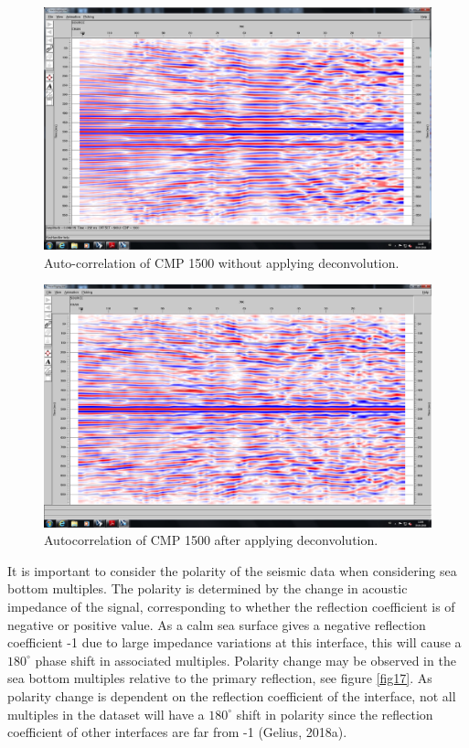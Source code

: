\documentclass[10pt,a4paper]{article}
\begin{document}
\begin{figure}[H]
\includegraphics[width=\textwidth, trim={1.5cm 1.5cm 1cm 1.5cm},clip]{fig15.jpg}
\caption{Auto-correlation of CMP 1500 without applying deconvolution.}
\label{fig15}
\end{figure}

\begin{figure}[H]
\includegraphics[width=\textwidth, trim={1.5cm 1.5cm 1cm 1.5cm},clip]{fig16.jpg}
\caption{Autocorrelation of CMP 1500 after applying deconvolution.}
\label{fig16}
\end{figure}

\noindent It is important to consider the polarity of the seismic data when considering sea bottom multiples. The polarity is determined by the change in acoustic impedance of the signal, corresponding to whether the reflection coefficient is of negative or positive value. As a calm sea surface gives a negative reflection coefficient -1 due to large impedance variations at this interface, this will cause a $180^{\circ}$ phase shift in associated multiples. Polarity change may be observed in the sea bottom multiples relative to the primary reflection, see figure \ref{fig17}. As polarity change is dependent on the reflection coefficient of the interface, not all multiples in the dataset will have a $180^{\circ}$ shift in polarity since the reflection coefficient of other interfaces are far from -1 (Gelius, 2018a).
\end{document}
